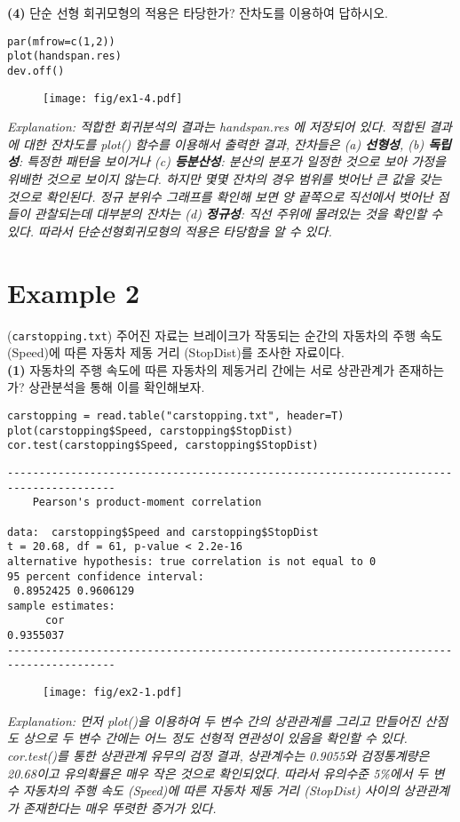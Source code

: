 \documentclass{article}
\begin{document}
\textbf{(4)} 단순 선형 회귀모형의 적용은 타당한가? 잔차도를 이용하여 답하시오.

\begin{lstlisting}[style={r-style}]
par(mfrow=c(1,2))
plot(handspan.res)
dev.off()
\end{lstlisting}
\begin{figure}[htb!]
    \centering
    \texttt{[image: fig/ex1-4.pdf]}
\end{figure}
\emph{Explanation: 적합한 회귀분석의 결과는 handspan.res 에 저장되어 있다. 적합된 결과에 대한 잔차도를 plot() 함수를 이용해서 출력한 결과, 잔차들은 (a) \textbf{선형성}, (b) \textbf{독립성}: 특정한 패턴을 보이거나 (c) \textbf{등분산성}: 분산의 분포가 일정한 것으로 보아 가정을 위배한 것으로 보이지 않는다. 하지만 몇몇 잔차의 경우 범위를 벗어난 큰 값을 갖는 것으로 확인된다. 정규 분위수 그래프를 확인해 보면 양 끝쪽으로 직선에서 벗어난 점들이 관찰되는데 대부분의 잔차는 (d) \textbf{정규성}: 직선 주위에 몰려있는 것을 확인할 수 있다. 따라서 단순선형회귀모형의 적용은 타당함을 알 수 있다.} \\

\newpage
\section*{Example 2}
(\texttt{carstopping.txt}) 주어진 자료는 브레이크가 작동되는 순간의 자동차의 주행 속도 (Speed)에 따른 자동차 제동 거리 (StopDist)를 조사한 자료이다. \\

\textbf{(1)} 자동차의 주행 속도에 따른 자동차의 제동거리 간에는 서로 상관관계가 존재하는가? 상관분석을 통해 이를 확인해보자.

\begin{lstlisting}[style={r-style}]
carstopping = read.table("carstopping.txt", header=T)
plot(carstopping$Speed, carstopping$StopDist)
cor.test(carstopping$Speed, carstopping$StopDist)
\end{lstlisting}
\begin{lstlisting}[style={out-style}]
---------------------------------------------------------------------------------------
	Pearson's product-moment correlation

data:  carstopping$Speed and carstopping$StopDist
t = 20.68, df = 61, p-value < 2.2e-16
alternative hypothesis: true correlation is not equal to 0
95 percent confidence interval:
 0.8952425 0.9606129
sample estimates:
      cor 
0.9355037 
---------------------------------------------------------------------------------------
\end{lstlisting}
\begin{figure}[htb!]
    \centering
    \texttt{[image: fig/ex2-1.pdf]}
\end{figure}
\emph{Explanation: 먼저 plot()을 이용하여 두 변수 간의 상관관계를 그리고 만들어진 산점도 상으로 두 변수 간에는 어느 정도 선형적 연관성이 있음을 확인할 수 있다. cor.test()를 통한 상관관계 유무의
검정 결과, 상관계수는 0.9055와 검정통계량은 20.68이고 유의확률은 매우 작은 것으로 확인되었다. 따라서 유의수준 5\%에서 두 변수 자동차의 주행 속도 (Speed)에 따른 자동차 제동 거리 (StopDist) 사이의 상관관계가 존재한다는 매우 뚜렷한 증거가 있다.} \\
\end{document}

